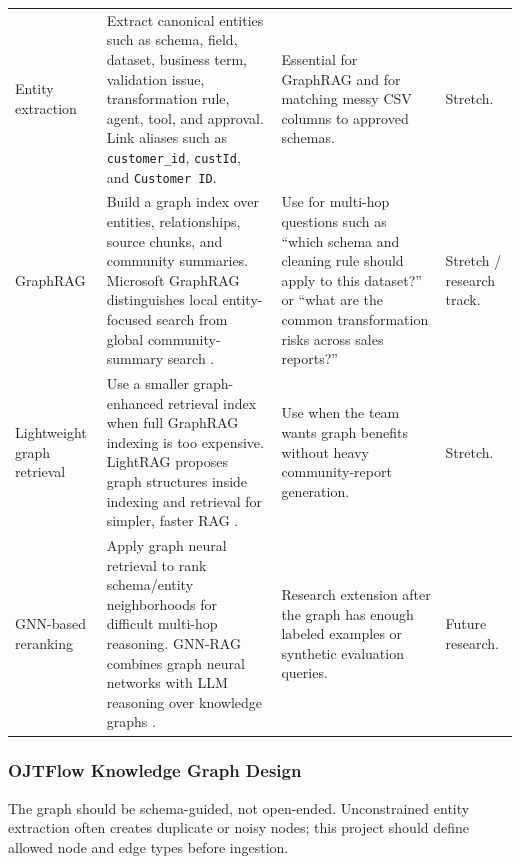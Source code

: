 \begin{longtable}{p{}p{}p{}p{}}
\addlinespace
Entity extraction & Extract canonical entities such as schema, field, dataset, business term, validation issue, transformation rule, agent, tool, and approval. Link aliases such as \texttt{customer\_id}, \texttt{custId}, and \texttt{Customer ID}. & Essential for GraphRAG and for matching messy CSV columns to approved schemas. & Stretch. \\
\addlinespace
GraphRAG & Build a graph index over entities, relationships, source chunks, and community summaries. Microsoft GraphRAG distinguishes local entity-focused search from global community-summary search \cite{edge2024graphrag,microsoftGraphRagDocs}. & Use for multi-hop questions such as ``which schema and cleaning rule should apply to this dataset?'' or ``what are the common transformation risks across sales reports?'' & Stretch / research track. \\
\addlinespace
Lightweight graph retrieval & Use a smaller graph-enhanced retrieval index when full GraphRAG indexing is too expensive. LightRAG proposes graph structures inside indexing and retrieval for simpler, faster RAG \cite{guo2024lightrag}. & Use when the team wants graph benefits without heavy community-report generation. & Stretch. \\
\addlinespace
GNN-based reranking & Apply graph neural retrieval to rank schema/entity neighborhoods for difficult multi-hop reasoning. GNN-RAG combines graph neural networks with LLM reasoning over knowledge graphs \cite{mavromatis2024gnnrag}. & Research extension after the graph has enough labeled examples or synthetic evaluation queries. & Future research. \\
\bottomrule
\end{longtable}

\subsubsection{OJTFlow Knowledge Graph Design}

The graph should be schema-guided, not open-ended. Unconstrained entity extraction often creates duplicate or noisy nodes; this project should define allowed node and edge types before ingestion.

